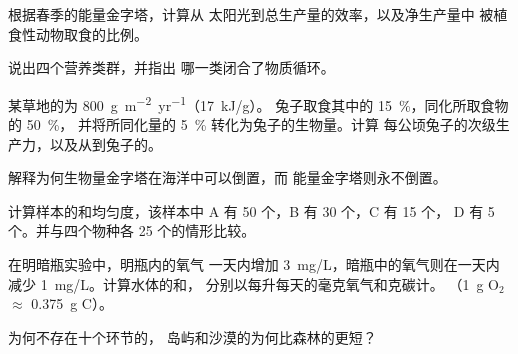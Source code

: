 \begin{exercise}[$\star$]\label{exo:b1:ecosystem-organization:3}
根据春季的能量金字塔，计算从
太阳光到总生产量的效率，以及净生产量中
被植食性动物取食的比例。
\end{exercise}

\begin{exercise}[$\star$]\label{exo:b1:ecosystem-organization:4}
说出四个营养类群，并指出
哪一类闭合了物质循环。
\end{exercise}

\begin{exercise}[$\star\star$]\label{exo:b1:ecosystem-organization:5}
某草地的为 \qty{800}{g.m^{-2}.yr^{-1}}（\qty{17}{kJ/g}）。
兔子取食其中的 \qty{15}{\%}，同化所取食物的 \qty{50}{\%}，
并将所同化量的 \qty{5}{\%} 转化为兔子的生物量。计算
每公顷兔子的次级生产力，以及从到兔子的。
\end{exercise}

\begin{exercise}[$\star\star$]\label{exo:b1:ecosystem-organization:6}
解释为何生物量金字塔在海洋中可以倒置，而
能量金字塔则永不倒置。
\end{exercise}

\begin{exercise}[$\star\star$]\label{exo:b1:ecosystem-organization:7}
计算样本的和均匀度，该样本中 A 有 50 个，B 有 30 个，C 有 15 个，
D 有 5 个。并与四个物种各 25 个的情形比较。
\end{exercise}

\begin{exercise}[$\star\star$]\label{exo:b1:ecosystem-organization:8}
在明暗瓶实验中，明瓶内的氧气
一天内增加 \qty{3}{mg/L}，暗瓶中的氧气则在一天内减少
\qty{1}{mg/L}。计算水体的和，
分别以每升每天的毫克氧气和克碳计。
（\qty{1}{g} $\mathrm{O_2}$ $\approx$ \qty{0.375}{g} C）。
\end{exercise}

\begin{exercise}[$\star\star$]\label{exo:b1:ecosystem-organization:9}
为何不存在十个环节的，
岛屿和沙漠的为何比森林的更短？
\end{exercise}

